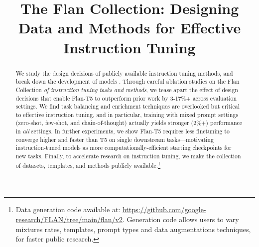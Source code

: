 \title{The Flan Collection: Designing Data and Methods for Effective Instruction Tuning}



\doparttoc %
\faketableofcontents %

\maketitle

\begin{abstract}
\noindent 

We study the design decisions of publicly available instruction tuning methods, and break down the development of \flantwo{} models \citep{chung2022scaling}.
Through careful ablation studies on the Flan Collection \emph{of instruction tuning tasks and methods}, we tease apart the effect of design decisions that enable Flan-T5 to outperform prior work by 3-17\%+ across evaluation settings. 
We find task balancing and enrichment techniques are overlooked but critical to effective instruction tuning, and in particular, training with mixed prompt settings (zero-shot, few-shot, and chain-of-thought) actually yields stronger (2\%+) performance in \emph{all} settings.
In further experiments, we show Flan-T5 requires less finetuning to converge higher and faster than T5 on single downstream tasks---motivating instruction-tuned models as more computationally-efficient starting checkpoints for new tasks.
Finally, to accelerate research on instruction tuning, we make the \flantwo{} collection of datasets, templates, and methods publicly available.\footnote{Data generation code available at: \url{https://github.com/google-research/FLAN/tree/main/flan/v2}. Generation code allows users to vary mixtures rates, templates, prompt types and data augmentations techniques, for faster public research.}

\end{abstract}

\makeatletter
\newenvironment{customlegend}[1][]{%
    \begingroup
    \pgfplots@init@cleared@structures
    \pgfplotsset{#1}%
}{%
    \pgfplots@createlegend
    \endgroup
}%

\def\addlegendimage{\csname pgfplots@addlegendimage\endcsname}

